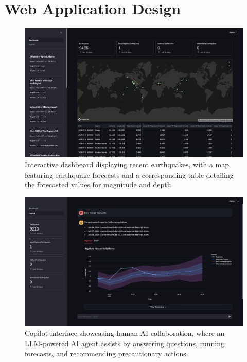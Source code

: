 \chapter{Web Application Design}\label{ch:web-application-design}

\begin{figure}[hbtp]
    \centering
    \includegraphics[scale=0.25]{img/dashboard.png}
    \captionsetup{format=hang}
    \caption{\label{fig:dashboard}Interactive dashboard displaying
        recent earthquakes, with a map featuring earthquake forecasts
        and a corresponding table detailing the forecasted values for
        magnitude and depth.}
\end{figure}

\begin{figure}[hbtp]
    \centering
    \includegraphics[scale=0.25]{img/copilot-forecast-example.png}
    \captionsetup{format=hang}
    \caption{\label{fig:copilot}Copilot interface showcasing human-AI
        collaboration, where an \ac{LLM}-powered AI agent assists by
        answering questions, running forecasts, and recommending
        precautionary actions.}
\end{figure}

